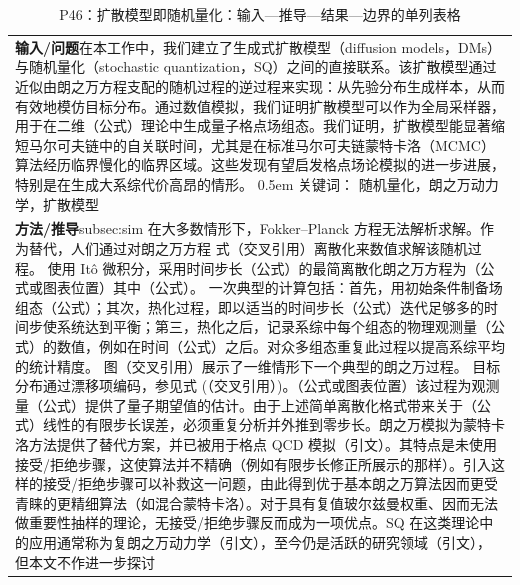 \documentclass[UTF8,11pt,oneside]{ctexbook}
\begin{document}
\begin{table}[htbp]
  \centering
  \caption*{P46：扩散模型即随机量化：输入—推导—结果—边界的单列表格}
  \small
  \begin{tabular}{@{}p{}@{}}
    \toprule
    \textbf{输入/问题}\quad 在本工作中，我们建立了生成式扩散模型（diffusion models，DMs）与随机量化（stochastic quantization，SQ）之间的直接联系。该扩散模型通过近似由朗之万方程支配的随机过程的逆过程来实现：从先验分布生成样本，从而有效地模仿目标分布。通过数值模拟，我们证明扩散模型可以作为全局采样器，用于在二维（公式）理论中生成量子格点场组态。我们证明，扩散模型能显著缩短马尔可夫链中的自关联时间，尤其是在标准马尔可夫链蒙特卡洛（MCMC）算法经历临界慢化的临界区域。这些发现有望启发格点场论模拟的进一步进展，特别是在生成大系综代价高昂的情形。 0.5em 关键词： 随机量化，朗之万动力学，扩散模型 \\
    \textbf{方法/推导}\quad subsec:sim 在大多数情形下，Fokker–Planck 方程无法解析求解。作为替代，人们通过对朗之万方程 式（交叉引用）离散化来数值求解该随机过程。 使用 Itô 微积分，采用时间步长（公式）的最简离散化朗之万方程为（公式或图表位置）其中（公式）。 一次典型的计算包括：首先，用初始条件制备场组态（公式）；其次，热化过程，即以适当的时间步长（公式）迭代足够多的时间步使系统达到平衡；第三，热化之后，记录系综中每个组态的物理观测量（公式）的数值，例如在时间（公式）之后。对众多组态重复此过程以提高系综平均的统计精度。 图（交叉引用）展示了一维情形下一个典型的朗之万过程。 目标分布通过漂移项编码，参见式 (（交叉引用）)。（公式或图表位置）该过程为观测量（公式）提供了量子期望值的估计。由于上述简单离散化格式带来关于（公式）线性的有限步长误差，必须重复分析并外推到零步长。朗之万模拟为蒙特卡洛方法提供了替代方案，并已被用于格点 QCD 模拟（引文）。其特点是未使用接受/拒绝步骤，这使算法并不精确（例如有限步长修正所展示的那样）。引入这样的接受/拒绝步骤可以补救这一问题，由此得到优于基本朗之万算法因而更受青睐的更精细算法（如混合蒙特卡洛）。对于具有复值玻尔兹曼权重、因而无法做重要性抽样的理论，无接受/拒绝步骤反而成为一项优点。SQ 在这类理论中的应用通常称为复朗之万动力学（引文），至今仍是活跃的研究领域（引文）， 但本文不作进一步探讨 \\

\end{tabular}
\end{table}
\end{document}
